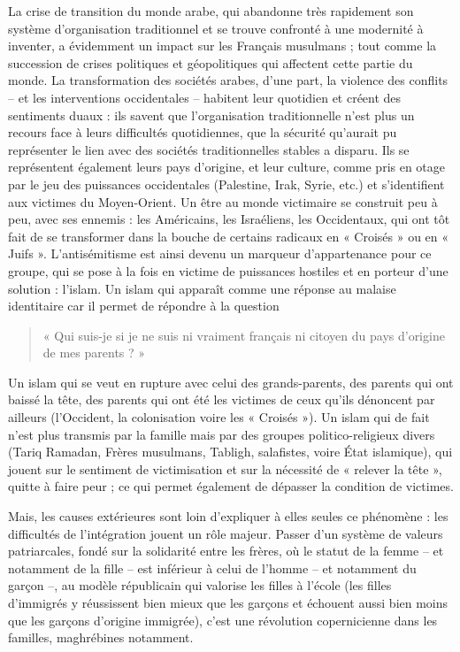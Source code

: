 La crise de transition du monde arabe, qui abandonne très rapidement son
système d'organisation traditionnel et se trouve confronté à une
modernité à inventer, a évidemment un impact sur les Français musulmans
; tout comme la succession de crises politiques et géopolitiques qui
affectent cette partie du monde. La transformation des sociétés arabes,
d'une part, la violence des conflits -- et les interventions
occidentales -- habitent leur quotidien et créent des sentiments duaux
: ils savent que l'organisation traditionnelle n'est plus un recours
face à leurs difficultés quotidiennes, que la sécurité qu'aurait pu
représenter le lien avec des sociétés traditionnelles stables a disparu.
Ils se représentent également leurs pays d'origine, et leur culture,
comme pris en otage par le jeu des puissances occidentales (Palestine,
Irak, Syrie, etc.) et s'identifient aux victimes du Moyen-Orient. Un
être au monde victimaire se construit peu à peu, avec ses ennemis : les
Américains, les Israéliens, les Occidentaux, qui ont tôt fait de se
transformer dans la bouche de certains radicaux en « Croisés » ou en «
Juifs ». L'antisémitisme est ainsi devenu un marqueur d'appartenance
pour ce groupe, qui se pose à la fois en victime de puissances
hostiles et en porteur d'une solution : l'islam. Un islam qui apparaît
comme une réponse au malaise identitaire car il permet de répondre à la
question


\begin{quote}
  « Qui suis-je si je ne suis ni vraiment français ni citoyen du pays
d'origine de mes parents ? »  
\end{quote}
Un islam qui se veut en rupture avec celui
des grands-parents, des parents qui ont baissé la tête, des parents qui
ont été les victimes de ceux qu'ils dénoncent par ailleurs (l'Occident,
la colonisation voire les « Croisés »). Un islam qui de fait n'est plus
transmis par la famille mais par des groupes politico-religieux divers
(Tariq Ramadan, Frères musulmans, Tabligh, salafistes, voire État
islamique), qui jouent sur le sentiment de victimisation et sur la
nécessité de « relever la tête », quitte à faire peur ; ce qui permet
également de dépasser la condition de victimes.

Mais, les causes extérieures sont loin d'expliquer à elles seules ce
phénomène : les difficultés de l'intégration jouent un rôle majeur.
Passer d'un système de valeurs patriarcales, fondé sur la solidarité
entre les frères, où le statut de la femme -- et notamment de la fille
-- est inférieur à celui de l'homme -- et notamment du garçon --, au
modèle républicain qui valorise les filles à l'école (les filles
d'immigrés y réussissent bien mieux que les garçons et échouent aussi
bien moins que les garçons d'origine immigrée), c'est une révolution
copernicienne dans les familles, maghrébines notamment.

